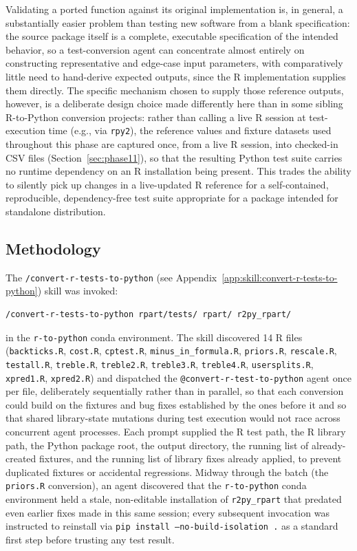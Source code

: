 \documentclass[12pt]{article}
\newcommand{\skillapp}[2]{\texttt{/#1} (see Appendix~\ref{app:skill:#2})}
\begin{document}
Validating a ported function against its original implementation is, in general, a substantially easier problem than testing new software from a blank specification: the source package itself is a complete, executable specification of the intended behavior, so a test-conversion agent can concentrate almost entirely on constructing representative and edge-case input parameters, with comparatively little need to hand-derive expected outputs, since the R implementation supplies them directly. The specific mechanism chosen to supply those reference outputs, however, is a deliberate design choice made differently here than in some sibling R-to-Python conversion projects: rather than calling a live R session at test-execution time (e.g., via \texttt{rpy2}), the reference values and fixture datasets used throughout this phase are captured once, from a live R session, into checked-in CSV files (Section~\ref{sec:phase11}), so that the resulting Python test suite carries no runtime dependency on an R installation being present. This trades the ability to silently pick up changes in a live-updated R reference for a self-contained, reproducible, dependency-free test suite appropriate for a package intended for standalone distribution.

\subsection{Methodology}

The \skillapp{convert-r-tests-to-python}{convert-r-tests-to-python} skill was invoked:
\begin{lstlisting}[style=skill]
/convert-r-tests-to-python rpart/tests/ rpart/ r2py_rpart/
\end{lstlisting}
in the \texttt{r-to-python} conda environment. The skill discovered 14 R files (\texttt{backticks.R}, \texttt{cost.R}, \texttt{cptest.R}, \texttt{minus\_in\_formula.R}, \texttt{priors.R}, \texttt{rescale.R}, \texttt{testall.R}, \texttt{treble.R}, \texttt{treble2.R}, \texttt{treble3.R}, \texttt{treble4.R}, \texttt{usersplits.R}, \texttt{xpred1.R}, \texttt{xpred2.R}) and dispatched the \texttt{@convert-r-test-to-python} agent once per file, deliberately sequentially rather than in parallel, so that each conversion could build on the fixtures and bug fixes established by the ones before it and so that shared library-state mutations during test execution would not race across concurrent agent processes. Each prompt supplied the R test path, the R library path, the Python package root, the output directory, the running list of already-created fixtures, and the running list of library fixes already applied, to prevent duplicated fixtures or accidental regressions. Midway through the batch (the \texttt{priors.R} conversion), an agent discovered that the \texttt{r-to-python} conda environment held a stale, non-editable installation of \texttt{r2py\_rpart} that predated even earlier fixes made in this same session; every subsequent invocation was instructed to reinstall via \texttt{pip install --no-build-isolation .} as a standard first step before trusting any test result.
\end{document}
